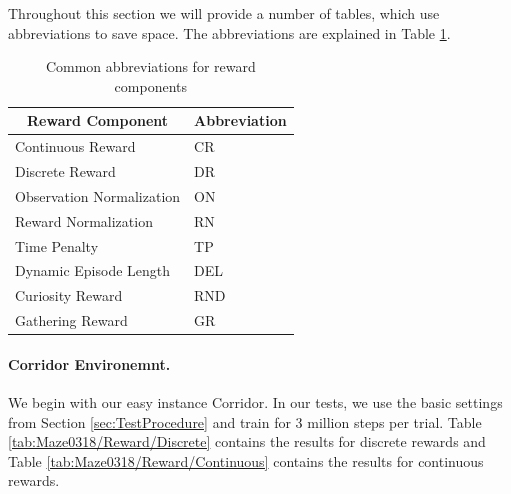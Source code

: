Throughout this section we will provide a number of tables, which use abbreviations to save space. The abbreviations are explained in Table \ref{tab:RewardAbbreviations}.  

\begin{table} [ht]
    \begin{center}
        \begin{tabular}{ll}
            \toprule
            \multicolumn{1}{c}{Reward Component} & Abbreviation \\
            \midrule
            Continuous Reward & CR \\
            Discrete Reward & DR \\
            Observation Normalization & ON \\
            Reward Normalization & RN \\
            Time Penalty & TP \\
            Dynamic Episode Length & DEL \\
            Curiosity Reward & RND \\
            Gathering Reward & GR \\
            \bottomrule
            
        \end{tabular}
    \end{center}
    \caption[Abbreviations for Reward Components]{Common abbreviations for reward components} \label{tab:RewardAbbreviations}
\end{table}



\paragraph{Corridor Environemnt.}
We begin with our easy instance Corridor. In our tests, we use the basic settings from Section \ref{sec:TestProcedure} and train for 3 million steps per trial. Table \ref{tab:Maze0318/Reward/Discrete} contains the results for discrete rewards and Table \ref{tab:Maze0318/Reward/Continuous} contains the results for continuous rewards.

